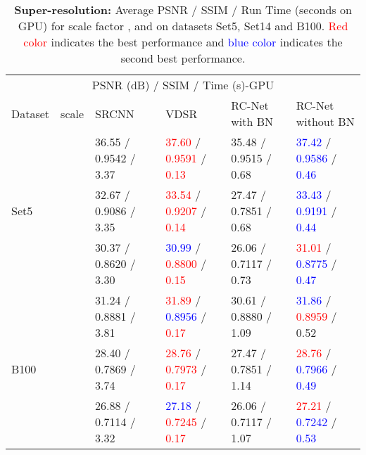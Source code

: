 \documentclass[10pt,twocolumn,letterpaper]{article}
\begin{document}
\setlength{\tabcolsep}{4pt}
\begin{table*}[h!]
\small
 \centering
  \caption{\small \textbf{Super-resolution:} Average PSNR / SSIM / Run Time (seconds on GPU) for scale factor ,  and  on datasets Set5, Set14 and B100. \textcolor{red}{Red color} indicates the best
performance and \textcolor{blue}{blue color} indicates the second best performance.}
 \label{tab:Scale}
  \begin{tabular}{llllll}
  \toprule
  \multicolumn{6}{c}{PSNR (dB) / SSIM / Time (s)-GPU }                   \\
     \cmidrule{1-6}
    Dataset & scale  & SRCNN  & VDSR  &  RC-Net with BN  &  RC-Net without BN \\
    
      \midrule
   \multirow{3}{0.8cm}{Set5} &   & 36.55  / 0.9542 / 3.37 & \textcolor{red}{37.60} / \textcolor{red}{0.9591} / \textcolor{red}{0.13} & 35.48 / 0.9515 / 0.68  & \textcolor{blue}{37.42} / \textcolor{blue}{0.9586} / \textcolor{blue}{0.46} \\
     &   & 32.67 / 0.9086 / 3.35 & \textcolor{red}{33.54} / \textcolor{red}{0.9207} / \textcolor{red}{0.14} & 27.47 / 0.7851 / 0.68  & \textcolor{blue}{33.43} / \textcolor{blue}{0.9191} / \textcolor{blue}{0.44}    \\
     
     &   & 30.37 / 0.8620 / 3.30  & \textcolor{blue}{30.99} / \textcolor{red}{0.8800} / \textcolor{red}{0.15} & 26.06 / 0.7117 / 0.73  & \textcolor{red}{31.01} / \textcolor{blue}{0.8775} / \textcolor{blue}{0.47}      \\
     \bottomrule
     
     \midrule
   \multirow{3}{0.8cm}{B100} &   & 31.24 / 0.8881 / 3.81 & \textcolor{red}{31.89} / \textcolor{blue}{0.8956} / \textcolor{red}{0.17} & 30.61 / 0.8880 / 1.09  & \textcolor{blue}{31.86} /  \textcolor{red}{0.8959} / 0.52 \\
     &   & 28.40 / 0.7869 / 3.74 & \textcolor{red}{28.76} / \textcolor{red}{0.7973} / \textcolor{red}{0.17} & 27.47 / 0.7851 / 1.14  & \textcolor{red}{28.76} / \textcolor{blue}{0.7966} / \textcolor{blue}{0.49}    \\
     &   & 26.88 / 0.7114 / 3.32 & \textcolor{blue}{27.18} / \textcolor{red}{0.7245} / \textcolor{red}{0.17} & 26.06 / 0.7117 / 1.07  & \textcolor{red}{27.21} / \textcolor{blue}{0.7242} / \textcolor{blue}{0.53}     \\
     \bottomrule
  \end{tabular} 
\end{table*}
\end{document}
